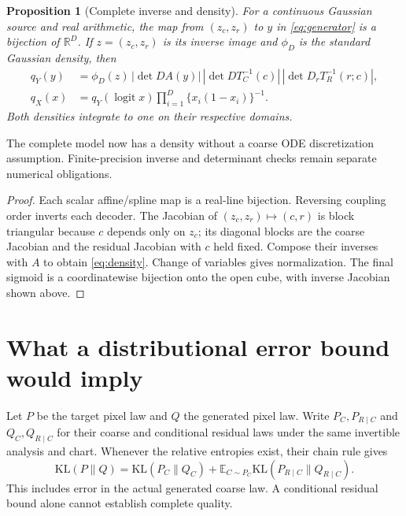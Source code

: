 \documentclass[11pt]{article}
\newtheorem{proposition}{Proposition}
\newcommand{\R}{\mathbb R}
\newcommand{\E}{\mathbb E}
\begin{document}
\begin{proposition}[Complete inverse and density]\label{prop:density}
For a continuous Gaussian source and real arithmetic, the map from $(z_c,z_r)$ to $y$ in \eqref{eq:generator} is a bijection of $\R^D$. If $z=(z_c,z_r)$ is its inverse image and $\phi_D$ is the standard Gaussian density, then
\begin{align}
 q_Y(y)&=\phi_D(z)\,|\det DA(y)|\,|\det DT_C^{-1}(c)|
           \,|\det D_rT_R^{-1}(r;c)|,\label{eq:density}\\
 q_X(x)&=q_Y(\operatorname{logit}x)\prod_{i=1}^D\{x_i(1-x_i)\}^{-1}.
\end{align}
Both densities integrate to one on their respective domains.
\end{proposition}
The complete model now has a density without a coarse ODE discretization assumption. Finite-precision inverse and determinant checks remain separate numerical obligations.
\begin{proof}
Each scalar affine/spline map is a real-line bijection. Reversing coupling order inverts each decoder. The Jacobian of $(z_c,z_r)\mapsto(c,r)$ is block triangular because $c$ depends only on $z_c$; its diagonal blocks are the coarse Jacobian and the residual Jacobian with $c$ held fixed. Compose their inverses with $A$ to obtain \eqref{eq:density}. Change of variables gives normalization. The final sigmoid is a coordinatewise bijection onto the open cube, with inverse Jacobian shown above.
\end{proof}

\section{What a distributional error bound would imply}
Let $P$ be the target pixel law and $Q$ the generated pixel law. Write $P_C,P_{R\mid C}$ and $Q_C,Q_{R\mid C}$ for their coarse and conditional residual laws under the same invertible analysis and chart. Whenever the relative entropies exist, their chain rule gives
\begin{equation}\label{eq:kl}
 \mathrm{KL}(P\|Q)=\mathrm{KL}(P_C\|Q_C)
       +\E_{C\sim P_C}\mathrm{KL}(P_{R\mid C}\|Q_{R\mid C}).
\end{equation}
This includes error in the actual generated coarse law. A conditional residual bound alone cannot establish complete quality.
\end{document}

